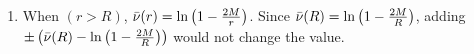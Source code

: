 \documentclass[a4paper]{article}
\begin{document}
\begin{enumerate}[label=(\alph*)]
\begin{enumerate}[label=(\alph*)]
        
        \item When $(r > R)$, $\Bar{\nu}(r) = \ln{\left( 1-\frac{2M}{r} \right)}$. Since $\Bar{\nu}(R) = \ln{\left( 1-\frac{2M}{R} \right)}$, adding $\pm \left(\Bar{\nu}(R) - \ln{\left( 1-\frac{2M}{R} \right)}\right)$ would not change the value.
    \end{enumerate}



\end{enumerate}
\end{document}
